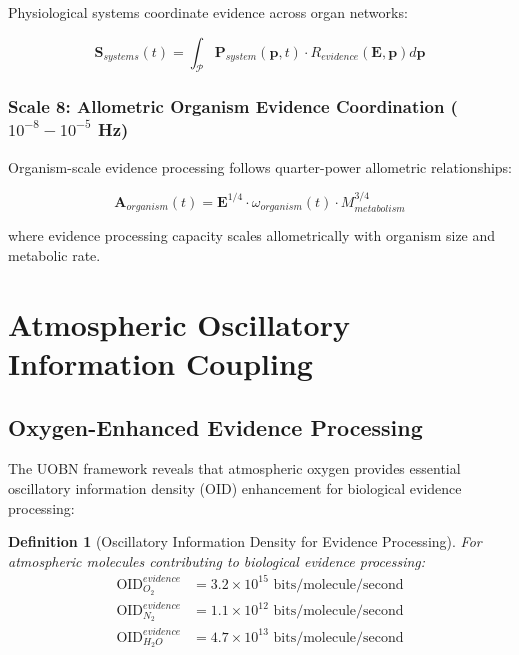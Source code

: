 \documentclass[12pt,a4paper]{article}
\newtheorem{definition}[theorem]{Definition}
\begin{document}
Physiological systems coordinate evidence across organ networks:

\begin{equation}
\mathbf{S}_{systems}(t) = \int_{\mathcal{P}} \mathbf{P}_{system}(\mathbf{p}, t) \cdot R_{evidence}(\mathbf{E}, \mathbf{p}) d\mathbf{p}
\end{equation}

\subsubsection{Scale 8: Allometric Organism Evidence Coordination ($10^{-8}-10^{-5}$ Hz)}

Organism-scale evidence processing follows quarter-power allometric relationships:

\begin{equation}
\mathbf{A}_{organism}(t) = \mathbf{E}^{1/4} \cdot \omega_{organism}(t) \cdot M_{metabolism}^{3/4}
\end{equation}

where evidence processing capacity scales allometrically with organism size and metabolic rate.

\section{Atmospheric Oscillatory Information Coupling}

\subsection{Oxygen-Enhanced Evidence Processing}

The UOBN framework reveals that atmospheric oxygen provides essential oscillatory information density (OID) enhancement for biological evidence processing:

\begin{definition}[Oscillatory Information Density for Evidence Processing]
For atmospheric molecules contributing to biological evidence processing:
\begin{align}
\text{OID}_{O_2}^{evidence} &= 3.2 \times 10^{15} \text{ bits/molecule/second} \\
\text{OID}_{N_2}^{evidence} &= 1.1 \times 10^{12} \text{ bits/molecule/second} \\
\text{OID}_{H_2O}^{evidence} &= 4.7 \times 10^{13} \text{ bits/molecule/second}
\end{align}
\end{definition}
\end{document}
